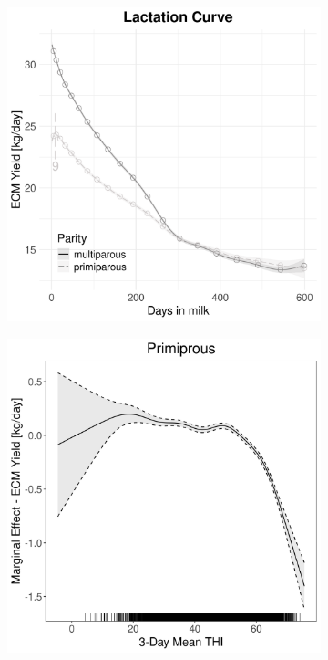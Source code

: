 \begin{figure}[H]
\begin{subfigure}[b]{0.45\textwidth}
        \includegraphics[width=\textwidth]{thesis/figures/models/ecm/full/si_ecm_full/si_ecm_full_marginal_dim_milk_combined.png}
    \end{subfigure}
    \begin{subfigure}[b]{0.45\textwidth}
        \centering
        \includegraphics[width=\textwidth]{thesis/figures/models/ecm/full/si_ecm_full/si_ecm_full_marginal_thi_milk_primi.png}

\end{subfigure}
\end{figure}
